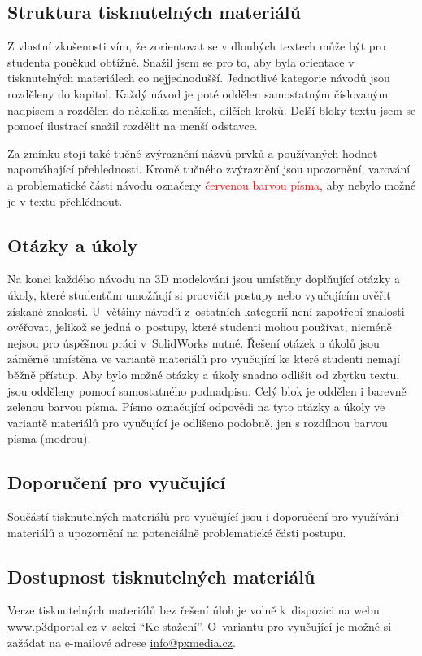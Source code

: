 \subsection{Struktura tisknutelných materiálů}
Z vlastní zkušenosti vím, že zorientovat se v dlouhých textech může být pro studenta poněkud obtížné.
Snažil jsem se pro to, aby byla orientace v tisknutelných materiálech co nejjednodušší.
Jednotlivé kategorie návodů jsou rozděleny do kapitol.
Každý návod je poté oddělen samostatným číslovaným nadpisem a rozdělen do několika menších, dílčích kroků.
Delší bloky textu jsem se pomocí ilustrací snažil rozdělit na menší odstavce.

Za zmínku stojí také tučné zvýraznění názvů prvků a používaných hodnot napomáhající přehlednosti.
Kromě tučného zvýraznění jsou upozornění, varování a problematické části návodu označeny \textcolor{red}{červenou barvou písma}, aby nebylo možné je v textu přehlédnout.

\subsection{Otázky a úkoly}
Na konci každého návodu na 3D modelování jsou umístěny doplňující otázky a úkoly, které studentům umožňují si procvičit postupy nebo vyučujícím ověřit získané znalosti.
U~většiny návodů z~ostatních kategorií není zapotřebí znalosti ověřovat, jelikož se jedná o~postupy, které studenti mohou používat, nicméně nejsou pro úspěšnou práci v~SolidWorks nutné.
Řešení otázek a úkolů jsou záměrně umístěna ve variantě materiálů pro vyučující ke které studenti nemají běžně přístup.
Aby bylo možné otázky a úkoly snadno odlišit od zbytku textu, jsou odděleny pomocí samostatného podnadpisu.
Celý blok je oddělen i barevně \textcolor{p3dgreen}{zelenou barvou písma}.
Písmo označující odpovědi na tyto otázky a úkoly ve variantě materiálů pro vyučující je odlišeno podobně, jen s rozdílnou barvou písma \textcolor{p3dblue}{(modrou)}.

\subsection*{Doporučení pro vyučující}
Součástí tisknutelných materiálů pro vyučující jsou i doporučení pro využívání materiálů a upozornění na potenciálně problematické části postupu.

\subsection{Dostupnost tisknutelných materiálů}
Verze tisknutelných materiálů bez řešení úloh je volně k~dispozici na webu \href{https://www.p3dportal.cz}{www.p3dportal.cz} v~sekci \enquote{Ke stažení}.
O~variantu pro vyučující je možné si zažádat na e-mailové adrese \href{mailto:info@pxmedia.cz}{info@pxmedia.cz}.

